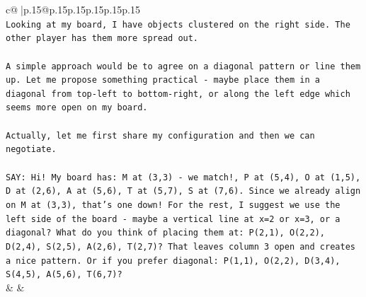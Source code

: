 \documentclass{article}
\begin{document}
{\begin{supertabular}{c@{$\;$}|p{.15\linewidth}@{}p{.15\linewidth}p{.15\linewidth}p{.15\linewidth}p{.15\linewidth}p{.15\linewidth}}
{{{\\ 
\texttt{Looking at my board, I have objects clustered on the right side. The other player has them more spread out.} \\
\\ 
\texttt{A simple approach would be to agree on a diagonal pattern or line them up. Let me propose something practical {-} maybe place them in a diagonal from top{-}left to bottom{-}right, or along the left edge which seems more open on my board.} \\
\\ 
\texttt{Actually, let me first share my configuration and then we can negotiate.} \\
\\ 
\texttt{SAY: Hi! My board has: M at (3,3) {-} we match!, P at (5,4), O at (1,5), D at (2,6), A at (5,6), T at (5,7), S at (7,6). Since we already align on M at (3,3), that's one down! For the rest, I suggest we use the left side of the board {-} maybe a vertical line at x=2 or x=3, or a diagonal? What do you think of placing them at: P(2,1), O(2,2), D(2,4), S(2,5), A(2,6), T(2,7)? That leaves column 3 open and creates a nice pattern. Or if you prefer diagonal: P(1,1), O(2,2), D(3,4), S(4,5), A(5,6), T(6,7)?} \\
            }
        }
    }
    & & \\ \\


\end{supertabular}}
\end{document}
